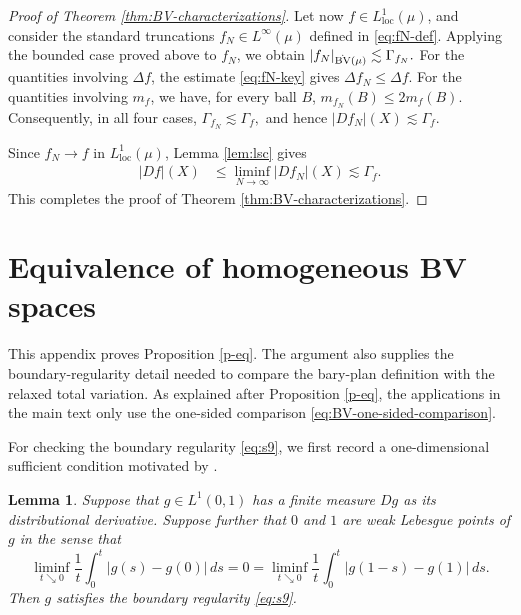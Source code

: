 \documentclass[11pt]{amsart}
\newtheorem{lemma}[theorem]{Lemma}
\theoremstyle{definition}
\theoremstyle{remark}
\numberwithin{equation}{section}
\newcommand{\abs}[1]{|#1|}
\begin{document}
\begin{proof}[Proof of Theorem \ref{thm:BV-characterizations}]
Let now $f\in L^1_{\mathrm{loc}}(\mu)$, and consider the standard truncations
$f_N\in L^\infty(\mu)$ defined in \eqref{eq:fN-def}. Applying the bounded
case proved above to $f_N$, we obtain
$|f_N|_{\dot{\rm BV}(\mu)}
\lesssim\Gamma_{f_N}.$
For the quantities involving $\Delta f$, the estimate \eqref{eq:fN-key} gives
$\Delta f_N\le \Delta f$. For the quantities involving $m_f$,  we have, for
every ball $B$,
$m_{f_N}(B)\le2m_f(B)$.
Consequently, in all four cases,
$\Gamma_{f_N}\lesssim\Gamma_f,$
and hence
$|Df_N|(X)\lesssim\Gamma_f.$

Since $f_N\to f$ in $L^1_{\mathrm{loc}}(\mu)$, Lemma \ref{lem:lsc} gives
\begin{align*}
|Df|(X)
&\le \liminf_{N\to\infty}|Df_N|(X)
\lesssim\Gamma_f.
\end{align*}
This completes the proof of Theorem \ref{thm:BV-characterizations}.
\end{proof}

\appendix

\section{Equivalence of homogeneous BV spaces}\label{app:homogeneous-BV-equivalence}

This appendix proves Proposition \ref{p-eq}.  The argument also supplies
the boundary-regularity detail needed to compare the bary-plan definition
with the relaxed total variation.  As explained after Proposition
\ref{p-eq}, the applications in the main text only use the one-sided
comparison \eqref{eq:BV-one-sided-comparison}.

For checking the boundary regularity \eqref{eq:s9}, we first record a
one-dimensional sufficient condition motivated by
\cite[p.~4169]{AD:14}.

\begin{lemma}\label{lem:ADM5.8aux}
Suppose that $g\in L^1(0,1)$ has a finite measure $Dg$ as its
distributional derivative. Suppose further that $0$ and $1$ are weak
Lebesgue points of $g$ in the sense that
\begin{equation}\label{eq:weakLeb}
 \liminf_{t\searrow 0}\frac{1}{t}\int_0^t\abs{g(s)-g(0)}\,ds
 =0
 =\liminf_{t\searrow 0}\frac{1}{t}\int_0^t
 \abs{g(1-s)-g(1)}\,ds.
\end{equation}
Then $g$ satisfies the boundary regularity \eqref{eq:s9}.
\end{lemma}
\end{document}
